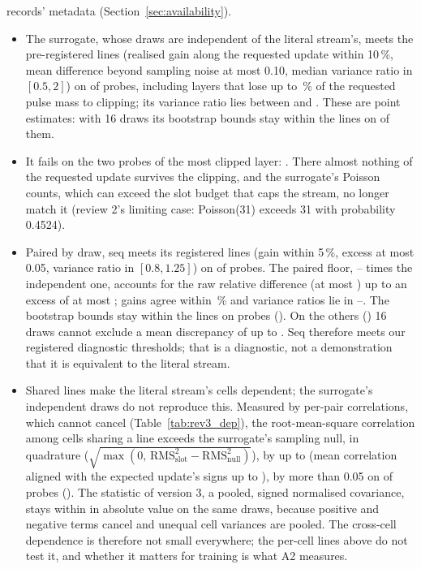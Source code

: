 records' metadata (Section~\ref{sec:availability}).
\begin{itemize}
\item The surrogate, whose draws are independent of the literal stream's, meets the pre-registered lines (realised gain along
      the requested update within 10\,\%, mean difference beyond sampling noise at most 0.10, median variance ratio in
      $[0.5, 2]$) on \RYProbeSurMeetsN{} of \RYProbeN{} probes, including layers that lose up to \RYProbeOkLostMax\,\% of the
      requested pulse mass to clipping; its variance ratio lies between \RYProbeSurVarMin{} and \RYProbeSurVarMax. These are
      point estimates: with 16 draws its bootstrap bounds stay within the lines on \RYProbeSurAtNinetyFiveN{} of them.
\item It fails on the two probes of the most clipped layer: \RYProbeSurFailList. There almost nothing of the requested update
      survives the clipping, and the surrogate's Poisson counts, which can exceed the slot budget that caps the stream, no longer
      match it (review 2's limiting case: Poisson(31) exceeds 31 with probability 0.4524).
\item Paired by draw, seq meets its registered lines (gain within 5\,\%, excess at most 0.05, variance ratio in
      $[0.8, 1.25]$) on \RYProbeSeqMeetsN{} of \RYProbeN{} probes. The paired floor, \RYProbeFloorRatioMin--\RYProbeFloorRatioMax{}
      times the independent one, accounts for the raw relative difference (at most \RYProbeSeqRawMax) up to an excess of at
      most \RYProbeSeqExcessMax; gains agree within \RYProbeSeqGainDevMax\,\% and variance ratios lie in
      \RYProbeSeqVarMin--\RYProbeSeqVarMax. The bootstrap bounds stay within the lines on \RYProbeSeqAtNinetyFiveN{} probes
      (\RYProbeSeqAtNinetyFiveList). On the others (\RYProbeSeqNotNinetyFiveList) 16 draws cannot exclude a mean discrepancy of
      up to \RYProbeSeqExcessPNinetyFiveMax. Seq therefore meets our registered diagnostic thresholds; that is a diagnostic,
      not a demonstration that it is equivalent to the literal stream.
\item Shared lines make the literal stream's cells dependent; the surrogate's independent draws do not reproduce this.
      Measured by per-pair correlations, which cannot cancel (Table~\ref{tab:rev3_dep}), the root-mean-square correlation among
      cells sharing a line exceeds the surrogate's sampling null, in quadrature
      ($\sqrt{\max(0,\,\mathrm{RMS}_{\mathrm{slot}}^2-\mathrm{RMS}_{\mathrm{null}}^2)}$), by up to \RYDepExcessMax{} (mean correlation aligned with the
      expected update's signs up to \RYDepAlignedMax), by more than 0.05 on \RYDepLargeN{} of \RYProbeN{} probes
      (\RYDepLargeList). The statistic of version 3, a pooled, signed normalised covariance, stays within \RYDepVthreePooledMax{}
      in absolute value on the same draws, because positive and negative terms cancel and unequal cell variances are pooled.
      The cross-cell dependence is therefore not small everywhere; the per-cell lines above do not test it, and whether it
      matters for training is what A2 measures.
\end{itemize}
